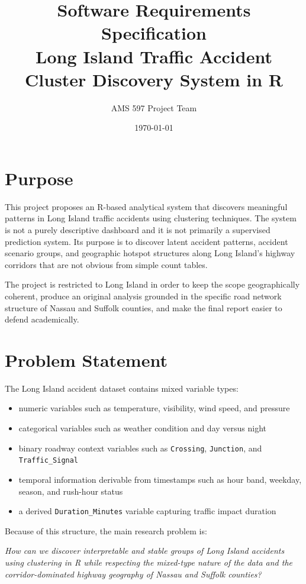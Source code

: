 \documentclass[11pt]{article}
\title{Software Requirements Specification\\Long Island Traffic Accident Cluster Discovery System in R}
\author{AMS 597 Project Team}
\date{\today}
\begin{document}
\maketitle

\section{Purpose}

This project proposes an R-based analytical system that discovers meaningful patterns in Long Island traffic accidents using clustering techniques. The system is not a purely descriptive dashboard and it is not primarily a supervised prediction system. Its purpose is to discover latent accident patterns, accident scenario groups, and geographic hotspot structures along Long Island's highway corridors that are not obvious from simple count tables.

The project is restricted to Long Island in order to keep the scope geographically coherent, produce an original analysis grounded in the specific road network structure of Nassau and Suffolk counties, and make the final report easier to defend academically.

\section{Problem Statement}

The Long Island accident dataset contains mixed variable types:

\begin{itemize}
\item numeric variables such as temperature, visibility, wind speed, and pressure
\item categorical variables such as weather condition and day versus night
\item binary roadway context variables such as \texttt{Crossing}, \texttt{Junction}, and \texttt{Traffic\_Signal}
\item temporal information derivable from timestamps such as hour band, weekday, season, and rush-hour status
\item a derived \texttt{Duration\_Minutes} variable capturing traffic impact duration
\end{itemize}

Because of this structure, the main research problem is:

\textit{How can we discover interpretable and stable groups of Long Island accidents using clustering in R while respecting the mixed-type nature of the data and the corridor-dominated highway geography of Nassau and Suffolk counties?}
\end{document}
